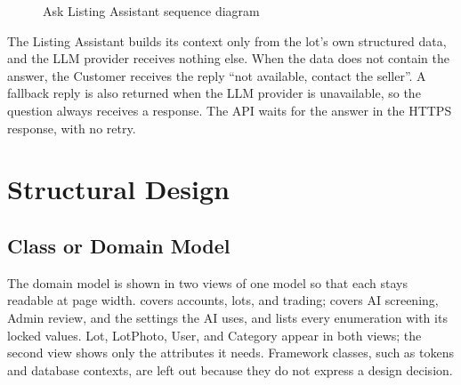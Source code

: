 \begin{figure}[H]
\centering
{}
\caption{Ask Listing Assistant sequence diagram}
\label{fig:sd-05}
\end{figure}

The Listing Assistant builds its context only from the lot's own structured data,
and the LLM provider receives nothing else. When the data does not contain the
answer, the Customer receives the reply ``not available, contact the seller''. A
fallback reply is also returned when the LLM provider is unavailable, so the
question always receives a response. The API waits for the answer in the HTTPS
response, with no retry.

\section{Structural Design }

\subsection{Class or Domain Model}
The domain model is shown in two views of one model so that each stays readable at page
width.  covers accounts, lots, and trading;
 covers AI screening, Admin review, and the settings the AI uses,
and lists every enumeration with its locked values. Lot, LotPhoto, User, and Category
appear in both views; the second view shows only the attributes it needs. Framework
classes, such as tokens and database contexts, are left out because they do not express
a design decision.

